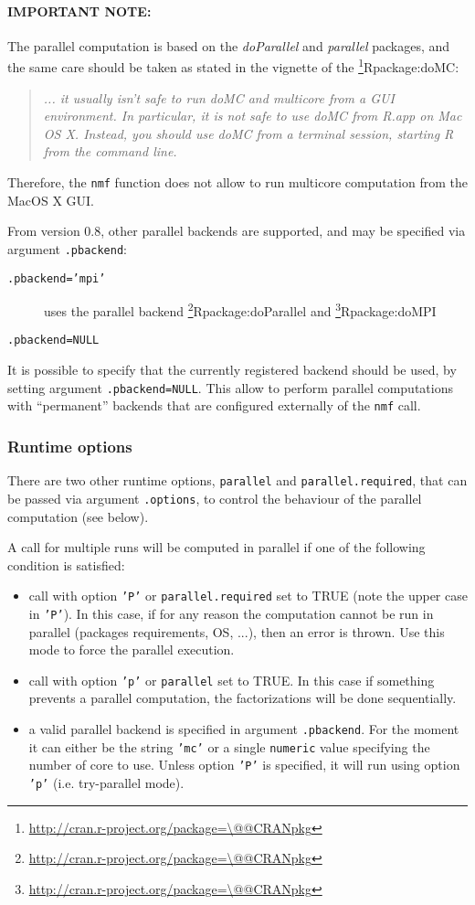 \documentclass[a4paper]{article}\usepackage[]{graphicx}\usepackage[]{color}
\makeatletter
\let\code=\texttt
\newcommand{\pkgname}[1]{\textit{#1}\xspace}
\newcommand{\CRANurl}[1]{\url{http://cran.r-project.org/package=#1}}
\def\CRANpkg{\@ifstar\@CRANpkg\@@CRANpkg}
\def\@CRANpkg#1{\href{http://cran.r-project.org/package=#1}{\pkgname{#1}}\footnote{\CRANurl{#1}}}
\def\@@CRANpkg#1{\href{http://cran.r-project.org/package=#1}{\pkgname{#1}} package\footnote{\CRANurl{#1}}}
\def\citeCRANpkg{\@ifstar\@citeCRANpkg\@@citeCRANpkg}
\def\@citeCRANpkg#1{\CRANpkg{#1}\cite*{Rpackage:#1}}
\def\@@citeCRANpkg#1{\CRANpkg{#1}~\cite{Rpackage:#1}}
\renewcommand{\cite}[1]{\parencite{#1}}
\makeatother
\begin{document}
\medskip
\paragraph{IMPORTANT NOTE:} 
The parallel computation is based on the \pkgname{doParallel} and
\pkgname{parallel} packages, and the same care should be taken as stated in the
vignette of the \citeCRANpkg{doMC}:
\begin{quote}
\emph{... it usually isn't safe to run doMC and multicore from a GUI environment. 
In particular, it is not safe to use doMC from R.app on Mac OS X. 
Instead, you should use doMC from a terminal session, starting R from the command line.}
\end{quote}
Therefore, the \code{nmf} function does not allow to run multicore computation from the 
MacOS X GUI.

From version 0.8, other parallel backends are supported, and may be specified
via argument \code{.pbackend}:

\begin{description}
  \item[\code{.pbackend='mpi'}] uses the parallel backend \citeCRANpkg{doParallel} and \citeCRANpkg{doMPI} 
  \item[\code{.pbackend=NULL}]{}
\end{description}

It is possible to specify that the currently registered backend should be
used, by setting argument \code{.pbackend=NULL}.
This allow to perform parallel computations with ``permanent'' backends that are
configured externally of the \code{nmf} call.

\subsubsection{Runtime options}
There are two other runtime options, \code{parallel} and
\code{parallel.required}, that can be passed via argument \code{.options}, to
control the behaviour of the parallel computation (see below).

\medskip
A call for multiple runs will be computed in parallel if one of the following condition is satisfied:

\begin{itemize}
\item call with option \code{'P'} or \code{parallel.required} set to TRUE (note the upper case in \code{'P'}). 
In this case, if for any reason the computation cannot be run in parallel (packages requirements, OS, ...), then an error is thrown. Use this mode to force the parallel execution.
\item call with option \code{'p'} or \code{parallel} set to TRUE. In this case if something prevents a parallel computation, the factorizations will be done 
sequentially.
\item a valid parallel backend is specified in argument \code{.pbackend}. 
For the moment it can either be the string \code{'mc'} or a single \code{numeric} value specifying the number of core to use. Unless option \code{'P'} is specified, it will run using option \code{'p'} (i.e. try-parallel mode).
\end{itemize}
\end{document}
